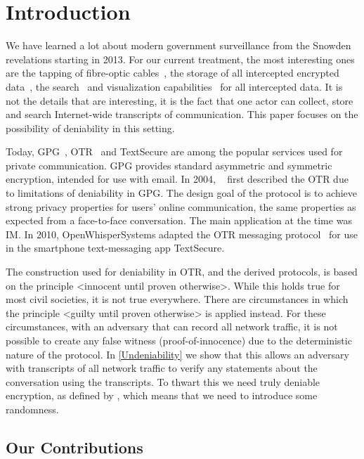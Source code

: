 \section{Introduction}

We have learned a lot about modern government surveillance from the Snowden 
revelations starting in 2013.
For our current treatment, the most interesting ones are the tapping of 
fibre-optic cables~\cite{Fibretap}, the storage of all intercepted encrypted 
data~\cite{NSAStoringCiphertexts}, the search~\cite{XKeyscore} and 
visualization capabilities~\cite{BoundlessInformant} for all intercepted data.
It is not the details that are interesting, it is the fact that one actor can 
collect, store and search Internet-wide transcripts of communication.
This paper focuses on the possibility of deniability in this setting.

Today, \ac{GPG}~\cite{gpg}, \ac{OTR}~\cite{otr2004} and Text\-Secure 
\cite{textsecure} are among the popular services used for private 
communication.
\ac{GPG} provides standard asymmetric and symmetric encryption, intended for 
use with email.
In 2004, \citeauthor{otr2004}~\cite{otr2004} first described the \ac{OTR} due 
to limitations of deniability in \ac{GPG}.
The design goal of the protocol is to achieve strong privacy properties for 
users' online communication, the same properties as expected from 
a face-to-face conversation.
The main application at the time was \ac{IM}.
In 2010, OpenWhisperSystems adapted the \ac{OTR} messaging 
protocol~\cite{frosch2014secure} for use in the smartphone text-messaging app 
TextSecure.

The construction used for deniability in \ac{OTR}, and the derived protocols, 
is based on the principle <innocent until proven otherwise>.
While this holds true for most civil societies, it is not true everywhere.
There are circumstances in which the principle <guilty until proven otherwise> 
is applied instead.
For these circumstances, with an adversary that can record all network traffic, 
it is not possible to create any false witness (proof-of-innocence) due to the 
deterministic nature of the protocol.
In \cref{Undeniability} we show that this allows an adversary with 
transcripts of all network traffic to verify any statements about the 
conversation using the transcripts.
To thwart this we need truly deniable encryption, as defined by 
\citet{DeniableEncryption}, which means that we need to introduce some 
randomness.

\subsection{Our Contributions}
\label{Contributions}

